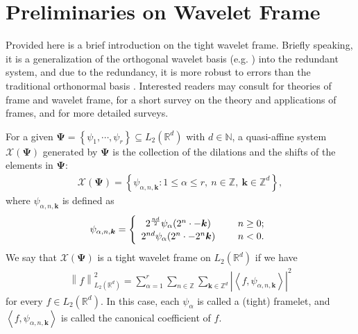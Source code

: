 \documentclass[reqno]{siamonline1116}
\numberwithin{theorem}{section}
\numberwithin{equation}{section}
\def\R{{\mathbb R}}
\def\N{{\mathbb N}}
\def\Z{{\mathbb Z}}
\def\f{\frac}
\def\la{\langle}
\def\ra{\rangle}
\def\bk{{\boldsymbol k}}
\def\msX{{\mathscr X}}
\def\Ps{{\boldsymbol \Psi}}
\def\la{\langle}
\def\ra{\rangle}
\begin{document}
\appendix
\section{Preliminaries on Wavelet Frame}\label{WaveletFrame} Provided here is a brief introduction on the tight wavelet frame. Briefly speaking, it is a generalization of the orthogonal wavelet basis (e.g. \cite{Mallat2008}) into the redundant system, and due to the redundancy, it is more robust to errors than the traditional orthonormal basis \cite{B.Dong2017a}. Interested readers may consult \cite{Daubechies1992,I.Daubechies2003,A.Ron1997} for theories of frame and wavelet frame, \cite{Shen2010} for a short survey on the theory and applications of frames, and \cite{B.Dong2013,B.Dong2015} for more detailed surveys.


For a given $\Ps=\left\{\psi_1,\cdots,\psi_r\right\}\subseteq L_2(\R^d)$ with $d\in\N$, a quasi-affine system $\msX(\Ps)$ generated by $\Ps$ is the collection of the dilations and the shifts of the elements in $\Ps$:
\begin{align}\label{QASystem}
\msX(\Ps)=\left\{\psi_{\alpha,n,\bk}:1\leq\alpha\leq r,~n\in\Z,~\bk\in\Z^d\right\},
\end{align}
where $\psi_{\alpha,n,\bk}$ is defined as
\begin{align}\label{QAFramelet}
\psi_{\alpha,n,\bk}=\left\{\begin{array}{cl}
2^{\f{nd}{2}}\psi_{\alpha}(2^n\cdot-\bk)~~&~~n\geq 0;\vspace{0.125em}\\
2^{nd}\psi_{\alpha}(2^n\cdot-2^{n}\bk)~~&~~n<0.
\end{array}\right.
\end{align}
We say that $\msX(\Ps)$ is a tight wavelet frame on $L_2(\R^d)$ if we have
\begin{align}\label{TightFrame}
\left\|f\right\|_{L_2(\R^d)}^2=\sum_{\alpha=1}^r\sum_{n\in\Z}\sum_{\bk\in\Z^d}\left|\left\la f,\psi_{\alpha,n,\bk}\right\ra\right|^2
\end{align}
for every $f\in L_2(\R^d)$. In this case, each $\psi_{\alpha}$ is called a (tight) framelet, and $\left\la f,\psi_{\alpha,n,\bk}\right\ra$ is called the canonical coefficient of $f$.
\end{document}
